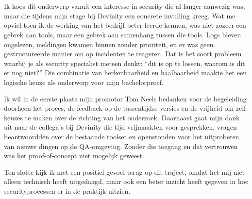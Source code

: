 
\chapter*{}%
\label{ch:voorwoord}


Ik koos dit onderwerp vanuit een interesse in security die al langer aanwezig was, maar die tijdens mijn stage bij Devinity een concrete invulling kreeg. Wat me opviel toen ik de werking van het bedrijf beter leerde kennen, was niet zozeer een gebrek aan tools, maar een gebrek aan samenhang tussen die tools. Logs bleven ongelezen, meldingen kwamen binnen zonder prioriteit, en er was geen gestructureerde manier om op incidenten te reageren. Dat is het soort probleem waarbij je als security specialist meteen denkt: ``dit is op te lossen, waarom is dit er nog niet?'' Die combinatie van herkenbaarheid en haalbaarheid maakte het een logische keuze als onderwerp voor mijn bachelorproef.

Ik wil in de eerste plaats mijn promotor Tom Neels bedanken voor de begeleiding doorheen het proces, de feedback op de tussentijdse versies en de vrijheid om zelf keuzes te maken over de richting van het onderzoek. Daarnaast gaat mijn dank uit naar de collega's bij Devinity die tijd vrijmaakten voor gesprekken, vragen beantwoordden over de bestaande toolset en openstonden voor het uitproberen van nieuwe dingen op de QA-omgeving. Zonder die toegang en dat vertrouwen was het proof-of-concept niet mogelijk geweest.

Ten slotte kijk ik met een positief gevoel terug op dit traject, omdat het mij niet alleen technisch heeft uitgedaagd, maar ook een beter inzicht heeft gegeven in hoe securityprocessen er in de praktijk uitzien.

